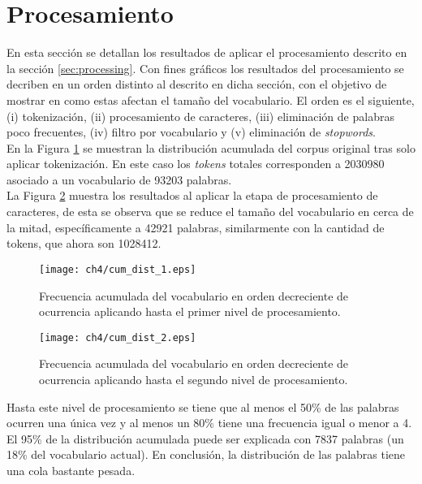 \section{Procesamiento}
\label{sec:data_processing}

En esta sección se detallan los resultados de aplicar el procesamiento descrito en la sección \ref{sec:processing}. Con fines gráficos los resultados del procesamiento se decriben en un orden distinto al descrito en dicha sección, con el objetivo de mostrar en como estas afectan el tamaño del vocabulario. El orden es el siguiente, (i) tokenización, (ii) procesamiento de caracteres, (iii) eliminación de palabras poco frecuentes, (iv) filtro por vocabulario y (v) eliminación de \textit{stopwords}.\\

En la Figura \ref{img:cum_dist1} se muestran la distribución acumulada del corpus original tras solo aplicar tokenización. En este caso los \textit{tokens} totales corresponden a 2030980 asociado a un vocabulario de 93203 palabras.\\

La Figura \ref{img:cum_dist2} muestra los resultados al aplicar la etapa de procesamiento de caracteres, de esta se observa que se reduce el tamaño del vocabulario en cerca de la mitad, específicamente a 42921 palabras, similarmente con la cantidad de tokens, que ahora son 1028412.

\begin{figure}
    \centering
    \texttt{[image: ch4/cum\_dist\_1.eps]}
    \caption{Frecuencia acumulada del vocabulario en orden decreciente de ocurrencia aplicando hasta el primer nivel de procesamiento.}
    \label{img:cum_dist1}
\end{figure}

\begin{figure}
    \centering
    \texttt{[image: ch4/cum\_dist\_2.eps]}
    \caption{Frecuencia acumulada del vocabulario en orden decreciente de ocurrencia aplicando hasta el segundo nivel de procesamiento.}
    \label{img:cum_dist2}
\end{figure}

Hasta este nivel de procesamiento se tiene que al menos el 50\% de las palabras ocurren una única vez y al menos un 80\% tiene una frecuencia igual o menor a 4. El 95\% de la distribución acumulada puede ser explicada con 7837 palabras (un 18\% del vocabulario actual). En conclusión, la distribución de las palabras tiene una cola bastante pesada.\\

